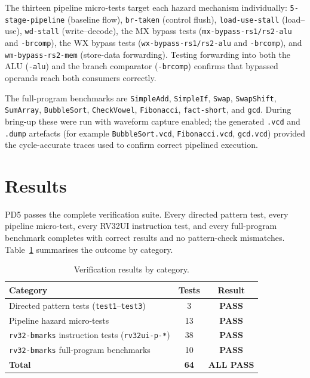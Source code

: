 \documentclass[11pt,a4paper]{article}
\newcommand{\code}[1]{\texttt{#1}}          %
\begin{document}
The thirteen pipeline micro-tests target each hazard mechanism individually:
\code{5-stage-pipeline} (baseline flow), \code{br-taken} (control flush),
\code{load-use-stall} (load--use), \code{wd-stall} (write--decode), the MX bypass tests
(\code{mx-bypass-rs1/rs2-alu} and \code{-brcomp}), the WX bypass tests
(\code{wx-bypass-rs1/rs2-alu} and \code{-brcomp}), and \code{wm-bypass-rs2-mem}
(store-data forwarding). Testing forwarding into both the ALU (\code{-alu}) and the branch
comparator (\code{-brcomp}) confirms that bypassed operands reach both consumers correctly.

The full-program benchmarks are \code{SimpleAdd}, \code{SimpleIf}, \code{Swap},
\code{SwapShift}, \code{SumArray}, \code{BubbleSort}, \code{CheckVowel}, \code{Fibonacci},
\code{fact-short}, and \code{gcd}. During bring-up these were run with waveform capture
enabled; the generated \code{.vcd} and \code{.dump} artefacts (for example
\code{BubbleSort.vcd}, \code{Fibonacci.vcd}, \code{gcd.vcd}) provided the cycle-accurate
traces used to confirm correct pipelined execution.

\section{Results}
\label{sec:results}
PD5 passes the complete verification suite. Every directed pattern test, every pipeline
micro-test, every RV32UI instruction test, and every full-program benchmark completes with
correct results and no pattern-check mismatches. Table~\ref{tab:results} summarises the
outcome by category.

\begin{table}[h]
\centering
\caption{Verification results by category.}
\label{tab:results}
\small
\begin{tabular}{@{}l c c@{}}
\toprule
\textbf{Category} & \textbf{Tests} & \textbf{Result} \\
\midrule
Directed pattern tests (\code{test1}--\code{test3}) & 3  & \textbf{PASS} \\
Pipeline hazard micro-tests                         & 13 & \textbf{PASS} \\
\code{rv32-bmarks} instruction tests (\code{rv32ui-p-*}) & 38 & \textbf{PASS} \\
\code{rv32-bmarks} full-program benchmarks          & 10 & \textbf{PASS} \\
\midrule
\textbf{Total}                                      & \textbf{64} & \textbf{ALL PASS} \\
\bottomrule
\end{tabular}
\end{table}
\end{document}
